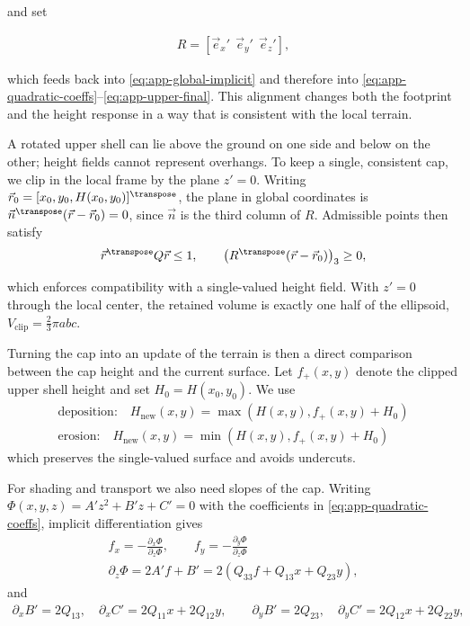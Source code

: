 and set

\begin{align}
    \label{eq:app-rotation-from-normal}
    R=[ \vec e_x'\ \ \vec e_y'\ \ \vec e_z' ],
\end{align}

which feeds back into \cref{eq:app-global-implicit} and therefore into \cref{eq:app-quadratic-coeffs}–\cref{eq:app-upper-final}. This alignment changes both the footprint and the height response in a way that is consistent with the local terrain.

A rotated upper shell can lie above the ground on one side and below on the other; height fields cannot represent overhangs. To keep a single, consistent cap, we clip in the local frame by the plane $z'=0$. Writing $\vec r_0=[x_0,y_0,H(x_0,y_0)]^\transpose $, the plane in global coordinates is $\vec n^\transpose (\vec r-\vec r_0)=0$, since $\vec n$ is the third column of $R$. Admissible points then satisfy
\begin{align}
    \vec r^\transpose Q\vec r \le 1,
    \qquad
    \left(R^\transpose (\vec r-\vec r_0)\right)_3 \ge 0,
\end{align}

which enforces compatibility with a single-valued height field. With $z'=0$ through the local center, the retained volume is exactly one half of the ellipsoid, $V_{\text{clip}}=\tfrac{2}{3}\pi abc$.

Turning the cap into an update of the terrain is then a direct comparison between the cap height and the current surface. Let $f_{+}(x,y)$ denote the clipped upper shell height and set $H_0=H(x_0,y_0)$. We use
\begin{align}
    \text{deposition:} \quad H_{\text{new}}(x,y)=\max\left(H(x,y), f_{+}(x,y)+H_0\right) \\
    \text{erosion:}\quad H_{\text{new}}(x,y)=\min\left(H(x,y), f_{+}(x,y)+H_0\right)
\end{align}
which preserves the single-valued surface and avoids undercuts.

For shading and transport we also need slopes of the cap. Writing $\Phi(x,y,z)=A'z^2+B'z+C'=0$ with the coefficients in \cref{eq:app-quadratic-coeffs}, implicit differentiation gives
\begin{align}
    f_x=-\frac{\partial_x\Phi}{\partial_z\Phi},
    \qquad
    f_y=-\frac{\partial_y\Phi}{\partial_z\Phi} \\
    \partial_z\Phi=2A' f + B' = 2\left(Q_{33} f + Q_{13}x + Q_{23}y\right),
\end{align}
and
\begin{align}
    \partial_x B'=2Q_{13},\quad
    \partial_x C'=2Q_{11}x+2Q_{12}y,
    \qquad
    \partial_y B'=2Q_{23},\quad
    \partial_y C'=2Q_{12}x+2Q_{22}y,
\end{align}

